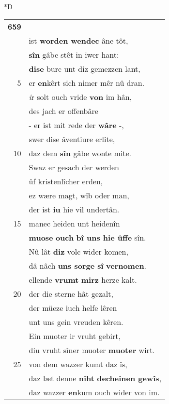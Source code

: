 \documentclass[8pt,a4paper,notitlepage]{article}
\begin{document}
\begin{table}[ht]
\begin{minipage}[t]{0.5\linewidth}
\small
\begin{center}*D
\end{center}
\begin{tabular}{rl}
\textbf{659} & \textbf{\begin{large}H\end{large}êrre}, sît iwer \textbf{starkiu} nôt\\ 
 & ist \textbf{worden wendec} âne tôt,\\ 
 & \textbf{sîn} gâbe stêt in iwer hant:\\ 
 & \textbf{dise} burc unt diz gemezzen lant,\\ 
5 & er \textbf{en}kêrt sich nimer mêr nû dran.\\ 
 & \textit{i}r solt ouch vride \textbf{von} im hân,\\ 
 & des jach er offenbâre\\ 
 & - er ist mit rede der \textbf{wâre} -,\\ 
 & swer dise âventiure erlite,\\ 
10 & daz dem \textbf{sîn} gâbe wonte mite.\\ 
 & Swaz er gesach der werden\\ 
 & ûf kristenlîcher erden,\\ 
 & ez wære magt, wîb oder man,\\ 
 & der ist \textbf{iu} hie vil undertân.\\ 
15 & manec heiden unt heidenîn\\ 
 & \textbf{muose} \textbf{ouch} \textbf{bî uns hie ûffe} sîn.\\ 
 & Nû lât \textbf{diz} volc wider komen,\\ 
 & dâ nâch \textbf{uns sorge sî} \textbf{vernomen}.\\ 
 & ellende \textbf{vrumt} \textbf{mirz} herze kalt.\\ 
20 & der die sterne hât gezalt,\\ 
 & der müeze iuch helfe lêren\\ 
 & unt uns gein vreuden kêren.\\ 
 & Ein muoter ir vruht gebirt,\\ 
 & diu vruht sîner muoter \textbf{muoter} wirt.\\ 
25 & von dem wazzer kumt daz îs,\\ 
 & daz læt denne \textbf{niht} \textbf{decheinen gewîs},\\ 
 & daz wazzer \textbf{en}kum ouch wider von im.\\ 

\end{tabular}
\end{minipage}
\end{table}
\end{document}
